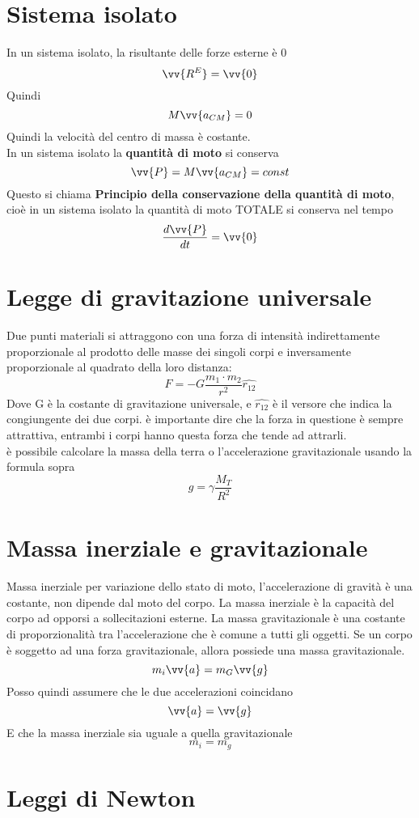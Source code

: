 \documentclass[a4paper]{report}
\begin{document}
  \section{Sistema isolato}
  In un sistema isolato, la risultante delle forze esterne è 0
  $$ \vv{R^E} = \vv{0}$$
  Quindi $$M \vv{a_{CM}} = 0$$
  Quindi la velocità del centro di massa è costante.\\
  In un sistema isolato la \textbf{quantità di moto} si conserva
  $$\vv{P} = M \vv{a_{CM}} = const$$
  Questo si chiama \textbf{Principio della conservazione della quantità di moto}, cioè in un sistema isolato la quantità di moto TOTALE si conserva nel tempo
  $$ \frac{d\vv{P}}{dt} = \vv{0}$$


  \section{Legge di gravitazione universale}
  Due punti materiali si attraggono con una forza di intensità indirettamente proporzionale al prodotto delle masse dei singoli corpi e inversamente proporzionale al quadrato della loro distanza:
  $$ F = - G \frac{m_1 \cdot m_2}{r^2} \hat{r_{12}} $$
  Dove G è la costante di gravitazione universale, e $\hat{r_{12}}$ è il versore che indica la congiungente dei due corpi. è importante dire che la forza in questione è sempre attrattiva, entrambi i corpi hanno questa forza che tende ad attrarli.\\
  è possibile calcolare la massa della terra o l'accelerazione gravitazionale usando la formula sopra
  $$g = \gamma \frac{M_T}{R^2}$$

  \section{Massa inerziale e gravitazionale}
  Massa inerziale per variazione dello stato di moto, l'accelerazione di gravità è una costante, non dipende dal moto del corpo. La massa inerziale è la capacità del corpo ad opporsi a sollecitazioni esterne. La massa gravitazionale è una costante di proporzionalità tra l'accelerazione che è comune a tutti gli oggetti. Se un corpo è soggetto ad una forza gravitazionale, allora possiede una massa gravitazionale.
  $$ m_i \vv{a} = m_G \vv{g} $$
  Posso quindi assumere che le due accelerazioni coincidano
  $$ \vv{a} = \vv{g} $$
  E che la massa inerziale sia uguale a quella gravitazionale
  $$ m_i = m_g$$

  \section{Leggi di Newton}
\end{document}
